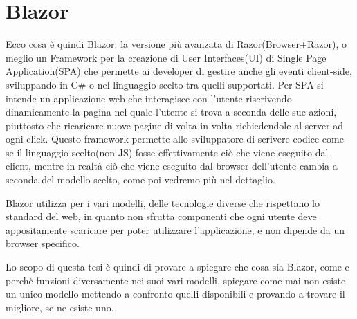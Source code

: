 \section{Blazor}
Ecco cosa \`e quindi Blazor: la versione pi\`u avanzata di Razor(Browser+Razor\cite{blazorWikiGitHub}), o meglio un Framework per la creazione di User Interfaces(UI) di Single Page Application(SPA) che permette ai developer di gestire anche gli eventi client-side, sviluppando in C\# o nel linguaggio scelto tra quelli supportati.
Per SPA si intende un applicazione web che interagisce con l'utente riscrivendo dinamicamente la pagina nel quale l'utente si trova a seconda delle sue azioni, piuttosto che ricaricare nuove pagine di volta in volta richiedendole al server ad ogni click\cite{SPA}.
Questo framework permette allo sviluppatore di scrivere codice come se il linguaggio scelto(non JS) fosse effettivamente ci\`o che viene eseguito dal client, mentre in realt\`a ci\`o che viene eseguito dal browser dell'utente cambia a seconda del modello scelto, come poi vedremo pi\`u nel dettaglio.

Blazor utilizza per i vari modelli, delle tecnologie diverse che rispettano lo standard del web, in quanto non sfrutta componenti che ogni utente deve appositamente scaricare per poter utilizzare l'applicazione, e non dipende da un browser specifico.

Lo scopo di questa tesi \`e quindi di provare a spiegare che cosa sia Blazor, come e perch\`e funzioni diversamente nei suoi vari modelli, spiegare come mai non esiste un unico modello mettendo a confronto quelli disponibili e provando a trovare il migliore, se ne esiste uno.